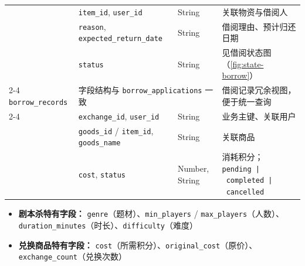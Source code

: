 \documentclass[a4paper,12pt]{article}
\begin{document}
\begin{table}[H]
{\begin{tabular}{p{2.8cm} p{3.2cm} p{2.2cm} p{5.5cm}}
                                                     & \texttt{item\_id}, \texttt{user\_id}                         & String          & 关联物资与借阅人                                                                                                                       \\
                                                     & \texttt{reason}, \texttt{expected\_return\_date}             & String          & 借阅理由、预计归还日期                                                                                                                    \\
                                                     & \texttt{status}                                              & String          & 见借阅状态图（\ref{fig:state-borrow}）                                                                                                 \\
      \cmidrule{2-4}
      \texttt{borrow\_records}                       & \multicolumn{2}{l}{字段结构与 \texttt{borrow\_applications} 一致}   & 借阅记录冗余视图，便于统一查询                                                                                                                                  \\
      \cmidrule{2-4}
      \multirow{3}{*}{\texttt{exchange\_records}}    & \texttt{exchange\_id}, \texttt{user\_id}                     & String          & 业务主键、关联用户                                                                                                                      \\
                                                     & \texttt{goods\_id} / \texttt{item\_id}, \texttt{goods\_name} & String          & 关联商品                                                                                                                           \\
                                                     & \texttt{cost}, \texttt{status}                               & Number, String  & 消耗积分；\texttt{pending\allowbreak\ |\allowbreak\ completed\allowbreak\ |\allowbreak\ cancelled}                                  \\
      \bottomrule
    \end{tabular}}
\end{table}

\vspace{-0.5cm}
\begin{itemize}[nosep, leftmargin=*, font=\footnotesize]
  \item \textbf{剧本杀特有字段：} \texttt{genre}（题材）、\texttt{min\_players} / \texttt{max\_players}（人数）、\texttt{duration\_minutes}（时长）、\texttt{difficulty}（难度）
  \item \textbf{兑换商品特有字段：} \texttt{cost}（所需积分）、\texttt{original\_cost}（原价）、\texttt{exchange\_count}（兑换次数）
\end{itemize}
\end{document}
